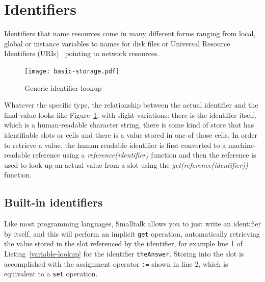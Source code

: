 \documentclass[preprint]{sigplanconf}
\begin{document}





\section{Identifiers}
\label{identifiers}


Identifiers that name resources come in many different forms ranging from local,
global or instance variables to names for disk files or Universal Resource Identifiers (URIs)~\cite{rfc3986} pointing to network resources.

\begin{figure}[htbp]
\centering
\texttt{[image: basic-storage.pdf]}
\caption{Generic identifier lookup}
\label{identifier-eval}
\end{figure}

Whatever the specific type, the relationship between the actual identifier and the
final value looks like Figure~\ref{identifier-eval}, with slight variations:   there is 
the identifier itself, which is a human-readable character string, there is some kind
of store that has identifiable slots or cells and there is a value stored in one of those
cells.   In order to retrieve a value, the human-readable identifier is first converted to a machine-readable reference using a
 \emph{reference(identifier)} function and then the reference is used to look up an actual
value from a slot using the \emph{get(reference(identifier))} function.



\subsection{Built-in identifiers}
\label{direct-reference}

Like most programming languages, Smalltalk allows you to just write 
an identifier by itself, and this will perform an implicit {\tt get} operation, automatically retrieving the value stored in the slot referenced by the identifier, for
example line 1 of Listing~\ref{variable-lookup} for the identifier {\tt theAnswer}.
Storing into the slot is accomplished with
the assignment operator {\tt :=} shown in line 2, which is equivalent to a {\tt set} operation.
\end{document}
